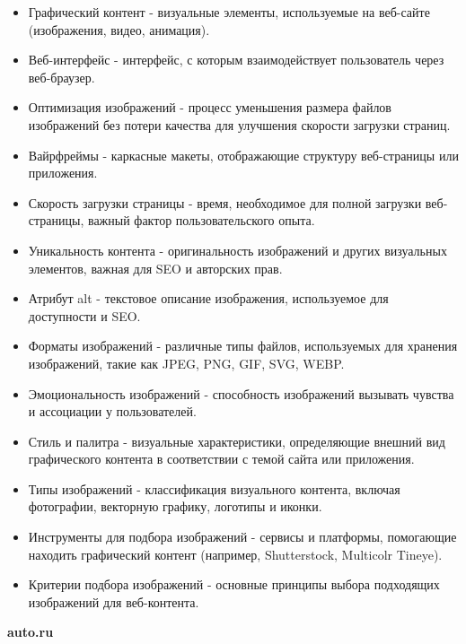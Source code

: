 \begin{itemize}
    \item Графический контент - визуальные элементы, используемые на веб-сайте (изображения, видео, анимация).
    \item Веб-интерфейс - интерфейс, с которым взаимодействует пользователь через веб-браузер.
    \item Оптимизация изображений - процесс уменьшения размера файлов изображений без потери качества для улучшения скорости загрузки страниц.
    \item Вайрфреймы - каркасные макеты, отображающие структуру веб-страницы или приложения.
    \item Скорость загрузки страницы - время, необходимое для полной загрузки веб-страницы, важный фактор пользовательского опыта.
    \item Уникальность контента - оригинальность изображений и других визуальных элементов, важная для SEO и авторских прав.
    \item Атрибут alt - текстовое описание изображения, используемое для доступности и SEO.
    \item Форматы изображений - различные типы файлов, используемых для хранения изображений, такие как JPEG, PNG, GIF, SVG, WEBP.
    \item Эмоциональность изображений - способность изображений вызывать чувства и ассоциации у пользователей.
    \item Стиль и палитра - визуальные характеристики, определяющие внешний вид графического контента в соответствии с темой сайта или приложения.
    \item Типы изображений - классификация визуального контента, включая фотографии, векторную графику, логотипы и иконки.
    \item Инструменты для подбора изображений - сервисы и платформы, помогающие находить графический контент (например, Shutterstock, Multicolr Tineye).
    \item Критерии подбора изображений - основные принципы выбора подходящих изображений для веб-контента.
\end{itemize}
\bigskip

\textbf{auto.ru}
\bigskip

\noindent
\begin{minipage}{\linewidth}
\end{minipage}
\bigskip

